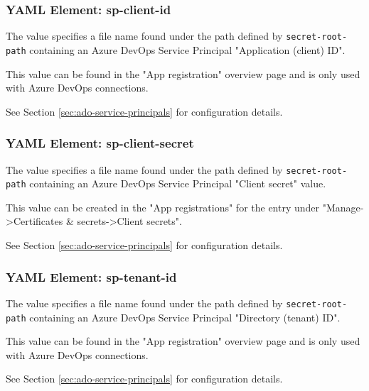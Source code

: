 \subsubsection{YAML Element: sp-client-id}\label{sec:yaml-api-auth-sp-client-id}
The value specifies a file name found under the path defined by \texttt{secret-root-path}
containing an Azure DevOps Service Principal "Application (client) ID".

This value can be found in the "App registration" overview page and is only used with
Azure DevOps connections.

See Section \ref{sec:ado-service-principals} for configuration details.

\subsubsection{YAML Element: sp-client-secret}\label{sec:yaml-api-auth-sp-client-secret}
The value specifies a file name found under the path defined by \texttt{secret-root-path}
containing an Azure DevOps Service Principal "Client secret" value.

This value can be created in the "App registrations" for the \cxoneflow entry under
"Manage->Certificates \& secrets->Client secrets".

See Section \ref{sec:ado-service-principals} for configuration details.

\subsubsection{YAML Element: sp-tenant-id}\label{sec:yaml-api-auth-sp-tenant-id}
The value specifies a file name found under the path defined by \texttt{secret-root-path}
containing an Azure DevOps Service Principal "Directory (tenant) ID".

This value can be found in the "App registration" overview page and is only used with
Azure DevOps connections.

See Section \ref{sec:ado-service-principals} for configuration details.
